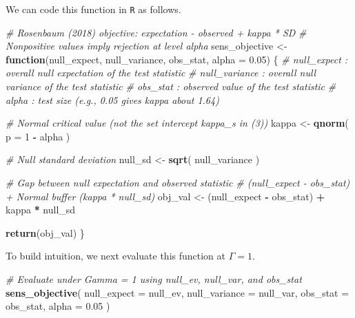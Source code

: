 \documentclass[
  12pt,
  leqno]{article}
\newenvironment{Shaded}{\begin{snugshade}}{\end{snugshade}}
\newcommand{\AttributeTok}[1]{\textcolor[rgb]{0.13,0.29,0.53}{#1}}
\newcommand{\CommentTok}[1]{\textcolor[rgb]{0.56,0.35,0.01}{\textit{#1}}}
\newcommand{\ControlFlowTok}[1]{\textcolor[rgb]{0.13,0.29,0.53}{\textbf{#1}}}
\newcommand{\DecValTok}[1]{\textcolor[rgb]{0.00,0.00,0.81}{#1}}
\newcommand{\FloatTok}[1]{\textcolor[rgb]{0.00,0.00,0.81}{#1}}
\newcommand{\FunctionTok}[1]{\textcolor[rgb]{0.13,0.29,0.53}{\textbf{#1}}}
\newcommand{\NormalTok}[1]{#1}
\newcommand{\OtherTok}[1]{\textcolor[rgb]{0.56,0.35,0.01}{#1}}
\newcommand{\SpecialCharTok}[1]{\textcolor[rgb]{0.81,0.36,0.00}{\textbf{#1}}}
\begin{document}
We can code this function in \texttt{R} as follows.

\singlespacing

\begin{Shaded}
\begin{Highlighting}[]
\CommentTok{\# Rosenbaum (2018) objective: expectation {-} observed + kappa * SD}
\CommentTok{\# Nonpositive values imply rejection at level alpha}
\NormalTok{sens\_objective }\OtherTok{\textless{}{-}} \ControlFlowTok{function}\NormalTok{(null\_expect,}
\NormalTok{                           null\_variance,}
\NormalTok{                           obs\_stat,}
                           \AttributeTok{alpha =} \FloatTok{0.05}\NormalTok{) \{}
  \CommentTok{\# null\_expect   : overall null expectation of the test statistic}
  \CommentTok{\# null\_variance : overall null variance of the test statistic}
  \CommentTok{\# obs\_stat      : observed value of the test statistic}
  \CommentTok{\# alpha         : test size (e.g., 0.05 gives kappa about 1.64)}

  \CommentTok{\# Normal critical value (not the set intercept kappa\_s in (3))}
\NormalTok{  kappa  }\OtherTok{\textless{}{-}} \FunctionTok{qnorm}\NormalTok{(}
    \AttributeTok{p =} \DecValTok{1} \SpecialCharTok{{-}}\NormalTok{ alpha}
\NormalTok{  )}

  \CommentTok{\# Null standard deviation}
\NormalTok{  null\_sd }\OtherTok{\textless{}{-}} \FunctionTok{sqrt}\NormalTok{(}
\NormalTok{    null\_variance}
\NormalTok{  )}

  \CommentTok{\# Gap between null expectation and observed statistic}
  \CommentTok{\# (null\_expect {-} obs\_stat) + Normal buffer (kappa * null\_sd)}
\NormalTok{  obj\_val }\OtherTok{\textless{}{-}}\NormalTok{ (null\_expect }\SpecialCharTok{{-}}\NormalTok{ obs\_stat) }\SpecialCharTok{+}\NormalTok{ kappa }\SpecialCharTok{*}\NormalTok{ null\_sd}

  \FunctionTok{return}\NormalTok{(obj\_val)}
\NormalTok{\}}
\end{Highlighting}
\end{Shaded}

\doublespacing

To build intuition, we next evaluate this function at \(\Gamma = 1\).

\singlespacing

\begin{Shaded}
\begin{Highlighting}[]
\CommentTok{\# Evaluate under Gamma = 1 using null\_ev, null\_var, and obs\_stat}
\FunctionTok{sens\_objective}\NormalTok{(}
  \AttributeTok{null\_expect   =}\NormalTok{ null\_ev,}
  \AttributeTok{null\_variance =}\NormalTok{ null\_var,}
  \AttributeTok{obs\_stat      =}\NormalTok{ obs\_stat,}
  \AttributeTok{alpha         =} \FloatTok{0.05}
\NormalTok{)}
\end{Highlighting}
\end{Shaded}
\end{document}
